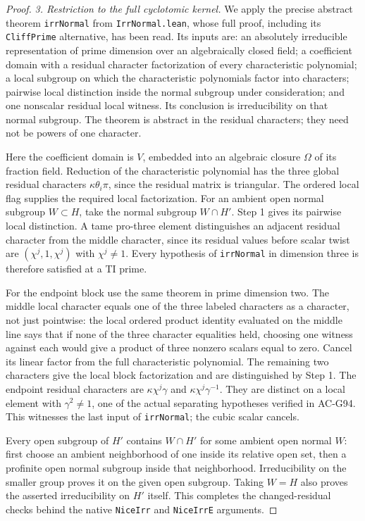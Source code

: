 \begin{proof}
\emph{3. Restriction to the full cyclotomic kernel.}
We apply the precise abstract theorem \texttt{irrNormal} from
\texttt{IrrNormal.lean}, whose full proof, including its
\texttt{CliffPrime} alternative, has been read.  Its inputs are:
an absolutely irreducible representation of prime dimension
over an algebraically closed field; a coefficient domain with
a residual character factorization of every characteristic
polynomial; a local subgroup on which the characteristic
polynomials factor into characters; pairwise local distinction
inside the normal subgroup under consideration; and one
nonscalar residual local witness.  Its conclusion is
irreducibility on that normal subgroup.  The theorem is
abstract in the residual characters; they need not be powers
of one character.

Here the coefficient domain is \(V\), embedded into an
algebraic closure \(\Omega\) of its fraction field.  Reduction
of the characteristic polynomial has the three global residual
characters \(\kappa\theta_i\pi\), since the residual matrix
is triangular.  The ordered local flag supplies the required
local factorization.  For an ambient open normal subgroup
\(W\subset H\), take the normal subgroup \(W\cap H'\).
Step 1 gives its pairwise local distinction.  A tame pro-three
element distinguishes an adjacent residual character from the
middle character, since its residual values before scalar twist
are \((\chi^j,1,\chi^j)\) with \(\chi^j\ne1\).
Every hypothesis of \texttt{irrNormal} in dimension three is
therefore satisfied at a TI prime.

For the endpoint block use the same theorem in prime dimension
two.  The middle local character equals one of the three labeled
characters as a character, not just pointwise: the local ordered
product identity evaluated on the middle line says that if none
of the three character equalities held, choosing one witness
against each would give a product of three nonzero scalars equal
to zero.  Cancel its linear factor from the full characteristic
polynomial.  The remaining two characters give the local block
factorization and are distinguished by Step 1.  The endpoint
residual characters are \(\kappa\chi^j\gamma\) and
\(\kappa\chi^j\gamma^{-1}\).  They are distinct on a local
element with \(\gamma^2\ne1\), one of the actual separating
hypotheses verified in AC-G94.  This witnesses the last input
of \texttt{irrNormal}; the cubic scalar cancels.

Every open subgroup of \(H'\) contains \(W\cap H'\) for some
ambient open normal \(W\): first choose an ambient neighborhood
of one inside its relative open set, then a profinite open normal
subgroup inside that neighborhood.  Irreducibility on the smaller
group proves it on the given open subgroup.  Taking \(W=H\)
also proves the asserted irreducibility on \(H'\) itself.
This completes the changed-residual checks behind the native
\texttt{NiceIrr} and \texttt{NiceIrrE} arguments.


\end{proof}
